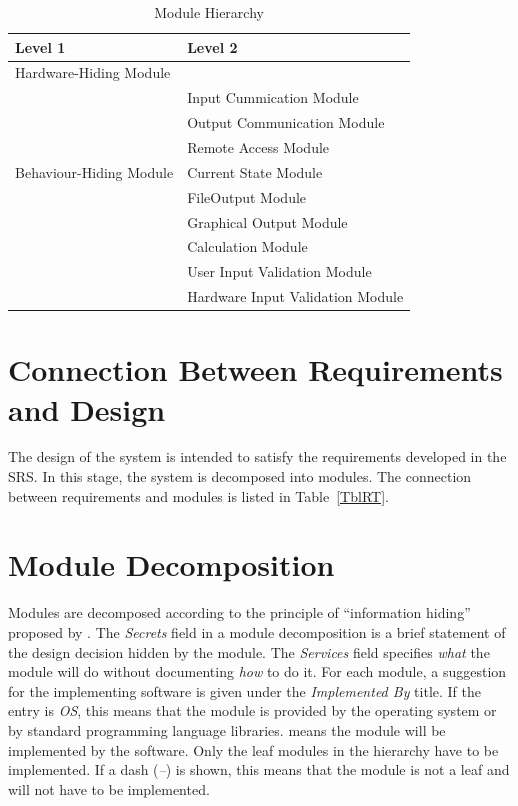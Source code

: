 \documentclass[12pt, titlepage]{article}
\begin{document}
\begin{table}[h!]
\centering
\begin{tabular}{p{} p{}}
\toprule
\textbf{Level 1} & \textbf{Level 2}\\
\midrule

{Hardware-Hiding Module} & ~ \\
\midrule

\multirow{7}{0.3\textwidth}{Behaviour-Hiding Module}
& Input Cummication Module\\
& Output Communication Module\\
& Remote Access Module\\
& Current State Module\\
& FileOutput Module\\
& Graphical Output Module\\ 
\midrule

\multirow{3}{0.3\textwidth}{Software Decision Module}
& Calculation Module\\
& User Input Validation Module \\
& Hardware Input Validation Module\\ 
\bottomrule

\end{tabular}
\caption{Module Hierarchy}
\label{TblMH}
\end{table}

\section{Connection Between Requirements and Design} \label{SecConnection}

The design of the system is intended to satisfy the requirements developed in
the SRS. In this stage, the system is decomposed into modules. The connection
between requirements and modules is listed in Table~\ref{TblRT}.

\section{Module Decomposition} \label{SecMD}
Modules are decomposed according to the principle of ``information hiding''
proposed by \citet{ParnasEtAl1984}. The \emph{Secrets} field in a module
decomposition is a brief statement of the design decision hidden by the
module. The \emph{Services} field specifies \emph{what} the module will do
without documenting \emph{how} to do it. For each module, a suggestion for the
implementing software is given under the \emph{Implemented By} title. If the
entry is \emph{OS}, this means that the module is provided by the operating
system or by standard programming language libraries.  \emph{\progname{}} means the
module will be implemented by the \progname{} software.
Only the leaf modules in the hierarchy have to be implemented. If a dash
(\emph{--}) is shown, this means that the module is not a leaf and will not have
to be implemented.
\end{document}
